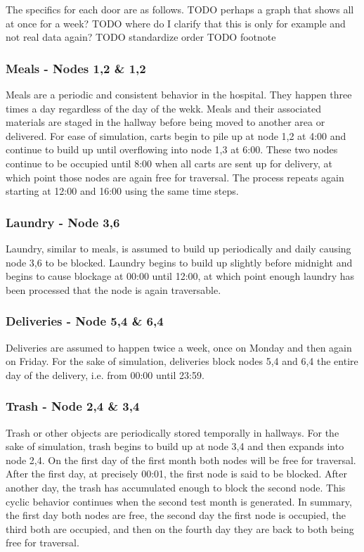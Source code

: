   The specifics for each door are as follows.
  TODO perhaps a graph that shows all at once for a week?
  TODO where do I clarify that this is only for example and not real data again?
  TODO standardize order
  TODO footnote

  \subsubsection{ Meals - Nodes 1,2 \& 1,2}

  Meals are a periodic and consistent behavior in the hospital. They happen
  three times a day regardless of the day of the wekk. Meals and their
  associated materials are staged in the hallway before being moved to
  another area or delivered. For ease of simulation, carts begin to pile up
  at node 1,2 at 4:00 and continue to build up until overflowing into node 1,3
  at 6:00. These two nodes continue to be occupied until 8:00 when all carts
  are sent up for delivery, at which point those nodes are again free for traversal. The
  process repeats again starting at 12:00 and 16:00 using the same time steps.

  \subsubsection{ Laundry - Node 3,6 }

  Laundry, similar to meals, is assumed to build up periodically and daily
  causing node 3,6 to be blocked. Laundry begins to build up slightly
  before midnight and begins to cause blockage at 00:00 until 12:00, at which
  point enough laundry has been processed that the node is again traversable.

  \subsubsection{ Deliveries - Node 5,4 \& 6,4 }

  Deliveries are assumed to happen twice a week, once on Monday and then again
  on Friday. For the sake of simulation, deliveries block nodes 5,4 and 6,4
  the entire day of the delivery, i.e. from 00:00 until 23:59.

  \subsubsection{ Trash - Node 2,4 \& 3,4 }

  Trash or other objects are periodically stored temporally in hallways.
  For the sake of simulation, trash begins to build up at node 3,4
  and then expands into node 2,4. On the first day of the first month both nodes
  will be free for traversal. After the first day, at precisely 00:01, the first
  node is said to be blocked. After another day, the trash has accumulated
  enough to block the second node. This cyclic behavior continues
  when the second test month is generated. In summary, the first day both nodes
  are free, the second day the first node is occupied, the third both are
  occupied, and then on the fourth day they are back to both being free for
  traversal.

